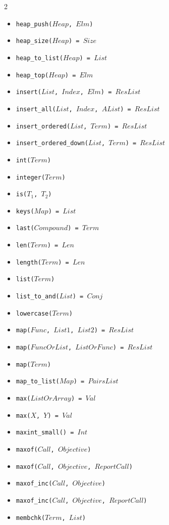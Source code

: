 \documentclass[10pt]{article}
\begin{document}
\begin{multicols}{2}
\begin{scriptsize}
\begin{itemize}
    \item \texttt{heap\_push($Heap$, $Elm$)}
    \item \texttt{heap\_size($Heap$) = $Size$}
    \item \texttt{heap\_to\_list($Heap$) = $List$}
    \item \texttt{heap\_top($Heap$) = $Elm$}
    \item \texttt{insert($List$, $Index$, $Elm$) = $ResList$} 
    \item \texttt{insert\_all($List$, $Index$, $AList$) = $ResList$} 
    \item \texttt{insert\_ordered($List$, $Term$) = $ResList$} 
    \item \texttt{insert\_ordered\_down($List$, $Term$) = $ResList$} 
    \item \texttt{int($Term$)} 
    \item \texttt{integer($Term$)} 
    \item \texttt{is($T_1$, $T_2$)} 
    \item \texttt{keys($Map$) = $List$} 
    \item \texttt{last($Compound$) = $Term$} 
    \item \texttt{len($Term$) = $Len$} 
    \item \texttt{length($Term$) = $Len$} 
    \item \texttt{list($Term$)} 
    \item \texttt{list\_to\_and($List$) = $Conj$}
    \item \texttt{lowercase($Term$)} 
    \item \texttt{map($Func$, $List1$, $List2$) = $ResList$} 
    \item \texttt{map($FuncOrList$, $ListOrFunc$) = $ResList$} 
    \item \texttt{map($Term$)} 
    \item \texttt{map\_to\_list($Map$) = $PairsList$} 
    \item \texttt{max($ListOrArray$) = $Val$} 
    \item \texttt{max($X$, $Y$) = $Val$} 
    \item \texttt{maxint\_small() = $Int$}
    \item \texttt{maxof($Call$, $Objective$)} 
    \item \texttt{maxof($Call$, $Objective$, $ReportCall$)} 
    \item \texttt{maxof\_inc($Call$, $Objective$)} 
    \item \texttt{maxof\_inc($Call$, $Objective$, $ReportCall$)} 
    \item \texttt{membchk($Term$, $List$)} 

\end{itemize}
\end{scriptsize}
\end{multicols}
\end{document}
